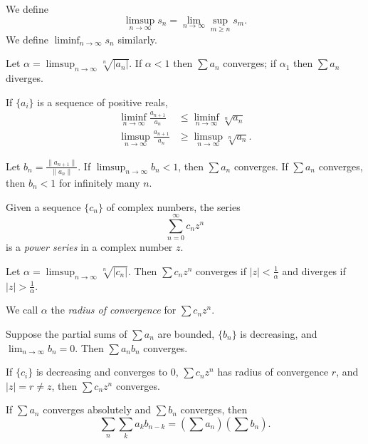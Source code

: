 \begin{defn}
    We define \[\limsup_{n\to\infty}
    s_n=\lim_{n\to\infty}\sup_{m\ge n} s_m.\]
    We define $\liminf_{n\to\infty} s_n$ similarly.
\end{defn}
\begin{prop}
    Let $\alpha=\limsup_{n\to\infty}\sqrt[n]{|a_n|}$. If $\alpha<1$ then $\sum
    a_n$ converges; if $\alpha_1$ then $\sum a_n$ diverges.
\end{prop}
\begin{prop}
    If $\{a_i\}$ is a sequence of positive reals,
\begin{align*}
    \liminf_{n\to\infty}\frac{a_{n+1}}{a_n}&\le\liminf_{n\to\infty}\sqrt[n]{a_n} \\
    \limsup_{n\to\infty}\frac{a_{n+1}}{a_n}&\ge\limsup_{n\to\infty}\sqrt[n]{a_n}.
\end{align*}
\end{prop}
\begin{cor}
    Let $b_n=\frac{\|a_{n+1}\|}{\|a_n\|}$. If $\limsup_{n\to\infty} b_n<1$,
    then $\sum a_n$ converges. If $\sum a_n$ converges, then $b_n<1$ for
    infinitely many $n$.
\end{cor}
\begin{defn}
    Given a sequence $\{c_n\}$ of complex numbers, the series
    \[\sum_{n=0}^\infty c_n z^n\] is a \emph{power series} in a complex number
    $z$.
\end{defn}
\begin{prop}
    Let $\alpha=\limsup_{n\to\infty}\sqrt[n]{|c_n|}$. Then $\sum c_n z^n$
    converges if $|z|<\frac1\alpha$ and diverges if $|z|>\frac1\alpha$.
\end{prop}
\begin{defn}
    We call $\alpha$ the \emph{radius of convergence} for $\sum c_n z^n$.
\end{defn}
\begin{prop}
    Suppose the partial sums of $\sum a_n$ are bounded, $\{b_n\}$ is decreasing,
    and $\lim_{n\to\infty} b_n=0$. Then $\sum a_n b_n$ converges.
\end{prop}
\begin{cor}
    If $\{c_i\}$ is decreasing and converges to $0$, $\sum c_n z^n$ has
    radius of convergence $r$, and $|z|=r\ne z$, then $\sum c_n z^n$ converges.
\end{cor}
\begin{prop}
    If $\sum a_n$ converges absolutely and $\sum b_n$ converges, then
    \[\sum_n\sum_k a_k b_{n-k}=\left(\sum a_n\right)\left(\sum b_n\right).\]
\end{prop}
